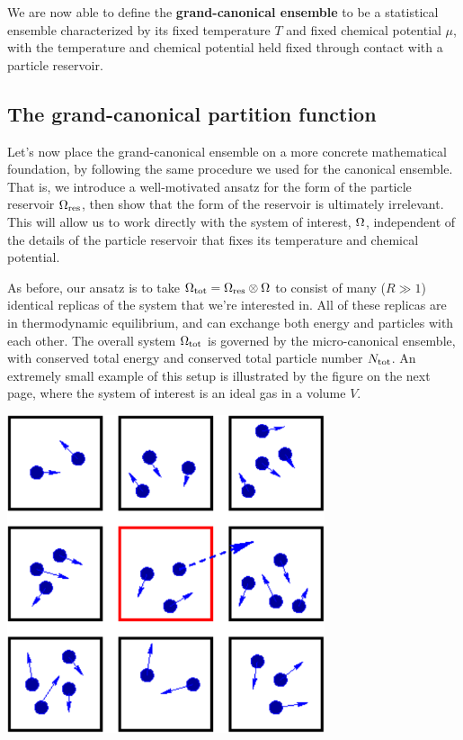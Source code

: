 \begin{shaded}
  We are now able to define the \textbf{grand-canonical ensemble} to be a statistical ensemble characterized by its fixed temperature $T$ and fixed chemical potential $\mu$, with the temperature and chemical potential held fixed through contact with a particle reservoir.
\end{shaded} %



\subsection{\label{sec:Zg}The grand-canonical partition function}
Let's now place the grand-canonical ensemble on a more concrete mathematical foundation, by following the same procedure we used for the canonical ensemble.
That is, we introduce a well-motivated ansatz for the form of the particle reservoir $\Omega_{\text{res}}$, then show that the form of the reservoir is ultimately irrelevant.
This will allow us to work directly with the system of interest, $\Omega$, independent of the details of the particle reservoir that fixes its temperature and chemical potential.

As before, our ansatz is to take $\Omega_{\text{tot}} = \Omega_{\text{res}} \otimes \Omega$ to consist of many ($R \gg 1$) identical replicas of the system \Om that we're interested in.
All of these replicas are in thermodynamic equilibrium, and can exchange both energy and particles with each other.
The overall system $\Omega_{\text{tot}}$ is governed by the micro-canonical ensemble, with conserved total energy \Etot and conserved total particle number $N_{\text{tot}}$.
An extremely small example of this setup is illustrated by the figure on the next page, where the system of interest is an ideal gas in a volume $V$.

\begin{center}
  \includegraphics[width=0.7\textwidth]{figs/unit06_reservoir.pdf}
\end{center}

